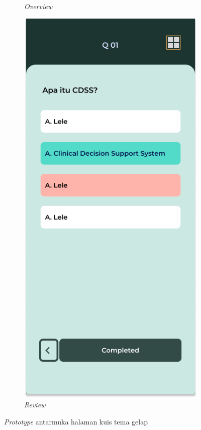 \begin{figure}[H]
\begin{subfigure}[b]{0.23\textwidth}
	  \caption{\textit{Overview}}
	  \label{fig:pilihNomorDark}
	\end{subfigure}
	\begin{subfigure}[b]{0.23\textwidth}
		\centering
	  \includegraphics[width=\linewidth]{contents/chapter-3/images/HF-kuis3-dt.png}
	  \caption{\textit{Review}}
	  \label{fig:KoreksiDark}
	\end{subfigure}
	\caption{\textit{Prototype} antarmuka halaman kuis tema gelap}
	\label{Fig:FeatureSetQuizDark}
\end{figure}
